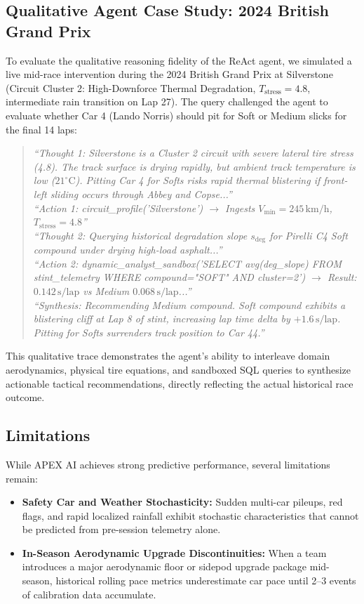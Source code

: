 \documentclass[journal]{IEEEtran}
\begin{document}
\subsection{Qualitative Agent Case Study: 2024 British Grand Prix}
To evaluate the qualitative reasoning fidelity of the ReAct agent, we simulated a live mid-race intervention during the 2024 British Grand Prix at Silverstone (Circuit Cluster 2: High-Downforce Thermal Degradation, $T_{\text{stress}} = 4.8$, intermediate rain transition on Lap 27). The query challenged the agent to evaluate whether Car 4 (Lando Norris) should pit for Soft or Medium slicks for the final 14 laps:
\begin{quote}
\textit{``Thought 1: Silverstone is a Cluster 2 circuit with severe lateral tire stress (4.8). The track surface is drying rapidly, but ambient track temperature is low ($21^\circ\text{C}$). Pitting Car 4 for Softs risks rapid thermal blistering if front-left sliding occurs through Abbey and Copse...''} \\
\textit{``Action 1: circuit\_profile('Silverstone') $\to$ Ingests $V_{\text{min}} = 245\,\text{km/h}$, $T_{\text{stress}} = 4.8$''} \\
\textit{``Thought 2: Querying historical degradation slope $s_{\text{deg}}$ for Pirelli C4 Soft compound under drying high-load asphalt...''} \\
\textit{``Action 2: dynamic\_analyst\_sandbox('SELECT avg(deg\_slope) FROM stint\_telemetry WHERE compound="SOFT" AND cluster=2') $\to$ Result: $0.142\,\text{s/lap}$ vs Medium $0.068\,\text{s/lap}$...''} \\
\textit{``Synthesis: Recommending Medium compound. Soft compound exhibits a blistering cliff at Lap 8 of stint, increasing lap time delta by $+1.6\,\text{s/lap}$. Pitting for Softs surrenders track position to Car 44.''}
\end{quote}
This qualitative trace demonstrates the agent's ability to interleave domain aerodynamics, physical tire equations, and sandboxed SQL queries to synthesize actionable tactical recommendations, directly reflecting the actual historical race outcome.

\subsection{Limitations}
While APEX AI achieves strong predictive performance, several limitations remain:
\begin{itemize}
    \item \textbf{Safety Car and Weather Stochasticity:} Sudden multi-car pileups, red flags, and rapid localized rainfall exhibit stochastic characteristics that cannot be predicted from pre-session telemetry alone.
    \item \textbf{In-Season Aerodynamic Upgrade Discontinuities:} When a team introduces a major aerodynamic floor or sidepod upgrade package mid-season, historical rolling pace metrics underestimate car pace until 2--3 events of calibration data accumulate.
\end{itemize}
\end{document}
